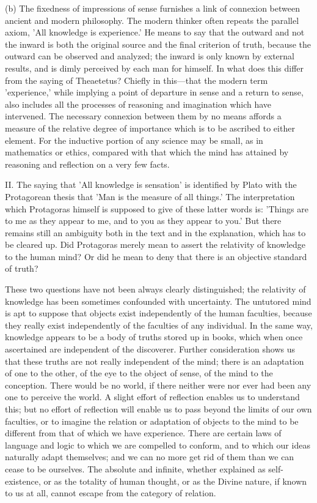 \documentclass[11pt,letter]{article}
\begin{document}
\par  (b) The fixedness of impressions of sense furnishes a link of connexion between ancient and modern philosophy. The modern thinker often repeats the parallel axiom, 'All knowledge is experience.' He means to say that the outward and not the inward is both the original source and the final criterion of truth, because the outward can be observed and analyzed; the inward is only known by external results, and is dimly perceived by each man for himself. In what does this differ from the saying of Theaetetus? Chiefly in this—that the modern term 'experience,' while implying a point of departure in sense and a return to sense, also includes all the processes of reasoning and imagination which have intervened. The necessary connexion between them by no means affords a measure of the relative degree of importance which is to be ascribed to either element. For the inductive portion of any science may be small, as in mathematics or ethics, compared with that which the mind has attained by reasoning and reflection on a very few facts.

\par  II. The saying that 'All knowledge is sensation' is identified by Plato with the Protagorean thesis that 'Man is the measure of all things.' The interpretation which Protagoras himself is supposed to give of these latter words is: 'Things are to me as they appear to me, and to you as they appear to you.' But there remains still an ambiguity both in the text and in the explanation, which has to be cleared up. Did Protagoras merely mean to assert the relativity of knowledge to the human mind? Or did he mean to deny that there is an objective standard of truth?

\par  These two questions have not been always clearly distinguished; the relativity of knowledge has been sometimes confounded with uncertainty. The untutored mind is apt to suppose that objects exist independently of the human faculties, because they really exist independently of the faculties of any individual. In the same way, knowledge appears to be a body of truths stored up in books, which when once ascertained are independent of the discoverer. Further consideration shows us that these truths are not really independent of the mind; there is an adaptation of one to the other, of the eye to the object of sense, of the mind to the conception. There would be no world, if there neither were nor ever had been any one to perceive the world. A slight effort of reflection enables us to understand this; but no effort of reflection will enable us to pass beyond the limits of our own faculties, or to imagine the relation or adaptation of objects to the mind to be different from that of which we have experience. There are certain laws of language and logic to which we are compelled to conform, and to which our ideas naturally adapt themselves; and we can no more get rid of them than we can cease to be ourselves. The absolute and infinite, whether explained as self-existence, or as the totality of human thought, or as the Divine nature, if known to us at all, cannot escape from the category of relation.
\end{document}
